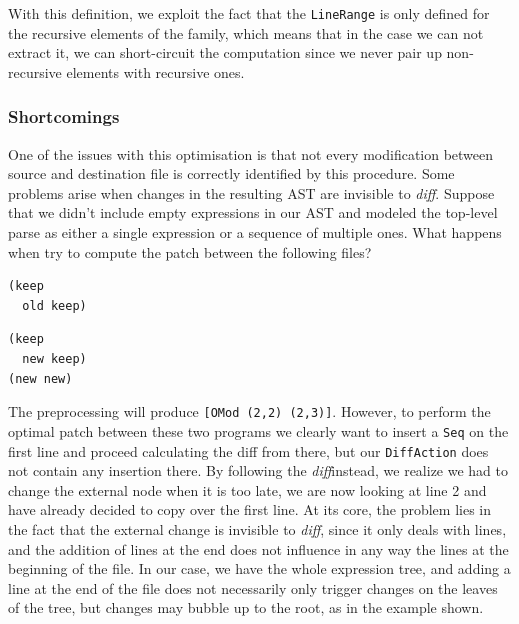 \documentclass[11pt, titlepage]{article}
\newcommand{\toHaskell}[1]{\texttt{#1}\xspace}
\newcommand{\diff}{\emph{diff}}
\begin{document}
With this definition, we exploit the fact that the \toHaskell{LineRange} is only defined for the recursive elements of the family, which means that in the case we can not extract it, we can short-circuit the computation since we never pair up non-recursive elements with recursive ones.

\subsubsection{Shortcomings}
One of the issues with this optimisation is that not every modification between source and destination file is correctly identified by this procedure. Some problems arise when changes in the resulting AST are invisible to \diff. Suppose that we didn't include empty expressions in our AST and modeled the top-level parse as either a single expression or a sequence of multiple ones. 
What happens when try to compute the patch between the following files?

\vspace{.6em}
\begin{minipage}[t]{0.5\textwidth}
\begin{verbatim}
(keep
  old keep)
\end{verbatim}
\end{minipage}
\begin{minipage}{0.5\textwidth}
\begin{verbatim}
(keep
  new keep)
(new new)
\end{verbatim}
\end{minipage}
\vspace{.6em}

The preprocessing will produce \toHaskell{[OMod (2,2) (2,3)]}. 
However, to perform the optimal patch between these two programs we clearly want to insert a \texttt{Seq} on the first line and proceed calculating the diff from there, but our \toHaskell{DiffAction} does not contain any insertion there. 
By following the \diff instead, we realize we had to change the external node when it is too late, we are now looking at line 2 and have already decided to copy over the first line. 
At its core, the problem lies in the fact that the external change is invisible to \diff, since it only deals with lines, and the addition of lines at the end does not influence in any way the lines at the beginning of the file. 
In our case, we have the whole expression tree, and adding a line at the end of the file does not necessarily only trigger changes on the leaves of the tree, but changes may bubble up to the root, as in the example shown. 
\end{document}
